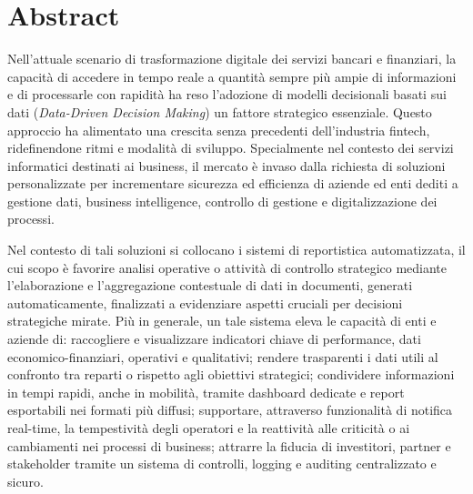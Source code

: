 \chapter*{Abstract}
Nell’attuale scenario di trasformazione digitale dei servizi bancari e finanziari, la capacità di accedere in tempo reale a quantità sempre più ampie di informazioni e di processarle con rapidità ha reso l’adozione di modelli decisionali basati sui dati (\emph{Data-Driven Decision Making}) un fattore strategico essenziale. Questo approccio ha alimentato una crescita senza precedenti dell’industria fintech, ridefinendone ritmi e modalità di sviluppo.
Specialmente nel contesto dei servizi informatici destinati ai business, il mercato è invaso dalla richiesta di soluzioni personalizzate per incrementare sicurezza ed efficienza di aziende ed enti dediti a gestione dati, business intelligence, controllo di gestione e digitalizzazione dei processi.

Nel contesto di tali soluzioni si collocano i sistemi di reportistica automatizzata, il cui scopo è favorire analisi operative o attività di controllo strategico mediante l'elaborazione e l'aggregazione contestuale di dati in documenti, generati automaticamente, finalizzati a evidenziare aspetti cruciali per decisioni strategiche mirate.
Più in generale, un tale sistema eleva le capacità di enti e aziende di: raccogliere e visualizzare indicatori chiave di performance, dati economico-finanziari, operativi e qualitativi; rendere trasparenti i dati utili al confronto tra reparti o rispetto agli obiettivi strategici; condividere informazioni in tempi rapidi, anche in mobilità, tramite dashboard dedicate e report esportabili nei formati più diffusi; supportare, attraverso funzionalità di notifica real-time, la tempestività degli operatori e la reattività alle criticità o ai cambiamenti nei processi di business; attrarre la fiducia di investitori, partner e stakeholder tramite un sistema di controlli, logging e auditing centralizzato e sicuro.

